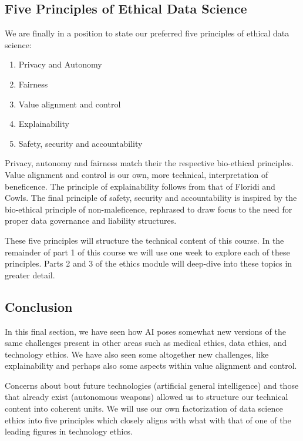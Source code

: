 \documentclass[
]{book}
\providecommand{\tightlist}{%
  \setlength{\itemsep}{0pt}\setlength{\parskip}{0pt}}
\theoremstyle{definition}
\theoremstyle{definition}
\theoremstyle{definition}
\theoremstyle{definition}
\theoremstyle{remark}
\begin{document}
\hypertarget{five-principles-of-ethical-data-science}{%
\subsection{Five Principles of Ethical Data Science}\label{five-principles-of-ethical-data-science}}

We are finally in a position to state our preferred five principles of ethical data science:

\begin{enumerate}
\def\labelenumi{\arabic{enumi}.}
\tightlist
\item
  Privacy and Autonomy
\item
  Fairness
\item
  Value alignment and control
\item
  Explainability
\item
  Safety, security and accountability
\end{enumerate}

Privacy, autonomy and fairness match their the respective bio-ethical principles. Value alignment and control is our own, more technical, interpretation of beneficence. The principle of explainability follows from that of Floridi and Cowls. The final principle of safety, security and accountability is inspired by the bio-ethical principle of non-maleficence, rephrased to draw focus to the need for proper data governance and liability structures.

These five principles will structure the technical content of this course. In the remainder of part 1 of this course we will use one week to explore each of these principles. Parts 2 and 3 of the ethics module will deep-dive into these topics in greater detail.

\hypertarget{conclusion-3}{%
\subsection{Conclusion}\label{conclusion-3}}

In this final section, we have seen how AI poses somewhat new versions of the same challenges present in other areas such as medical ethics, data ethics, and technology ethics. We have also seen some altogether new challenges, like explainability and perhaps also some aspects within value alignment and control.

Concerns about bout future technologies (artificial general intelligence) and those that already exist (autonomous weapons) allowed us to structure our technical content into coherent units. We will use our own factorization of data science ethics into five principles which closely aligns with what with that of one of the leading figures in technology ethics.
\end{document}
